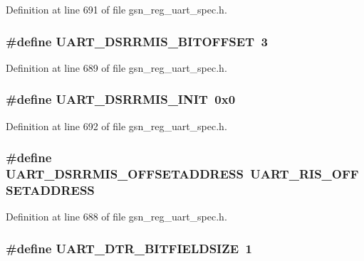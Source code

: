 Definition at line 691 of file gsn\_\-reg\_\-uart\_\-spec.h.

\hypertarget{a00575_af13f92ff2d29e54d008bed578047ea72}{
\subsubsection[{UART\_\-DSRRMIS\_\-BITOFFSET}]{\setlength{\rightskip}{0pt plus 5cm}\#define UART\_\-DSRRMIS\_\-BITOFFSET~3}}
\label{a00575_af13f92ff2d29e54d008bed578047ea72}


Definition at line 689 of file gsn\_\-reg\_\-uart\_\-spec.h.

\hypertarget{a00575_a9bc811fe9a0ddb9a5ef909043fd1d056}{
\subsubsection[{UART\_\-DSRRMIS\_\-INIT}]{\setlength{\rightskip}{0pt plus 5cm}\#define UART\_\-DSRRMIS\_\-INIT~0x0}}
\label{a00575_a9bc811fe9a0ddb9a5ef909043fd1d056}


Definition at line 692 of file gsn\_\-reg\_\-uart\_\-spec.h.

\hypertarget{a00575_a7d1499d4a3152c2b3a2f48c465a936fa}{
\subsubsection[{UART\_\-DSRRMIS\_\-OFFSETADDRESS}]{\setlength{\rightskip}{0pt plus 5cm}\#define UART\_\-DSRRMIS\_\-OFFSETADDRESS~UART\_\-RIS\_\-OFFSETADDRESS}}
\label{a00575_a7d1499d4a3152c2b3a2f48c465a936fa}


Definition at line 688 of file gsn\_\-reg\_\-uart\_\-spec.h.

\hypertarget{a00575_a4627c995f4a12f77db115ab536dbc524}{
\subsubsection[{UART\_\-DTR\_\-BITFIELDSIZE}]{\setlength{\rightskip}{0pt plus 5cm}\#define UART\_\-DTR\_\-BITFIELDSIZE~1}}
\label{a00575_a4627c995f4a12f77db115ab536dbc524}


